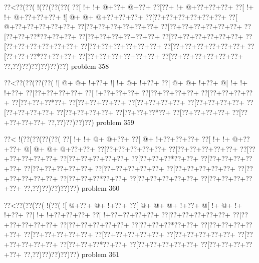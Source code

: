 \vbox{\vbox{\goo
\0??<\0??(\0??(\- !(\0??(\0??(\0??(
\0??[\- !+\- !+\- @+\0??+\- @+\0??+
\0??[\0??+\- !+\- @+\0??+\0??+\0??+
\0??[\- !+\- !+\- @+\0??+\0??+\0??+
\- ![\- @+\- @+\- @+\0??+\0??+\0??+
\0??[\0??+\0??+\0??+\0??+\0??+\0??+
\0??[\- @+\0??+\0??+\0??+\0??+\0??+
\0??[\0??+\0??+\0??+\0??+\0??+\0??+
\0??[\0??+\0??+\0??+\0??+\0??+\0??+
\0??[\0??+\0??+\0??*\0??+\0??+\0??+
\0??[\0??+\0??+\0??+\0??+\0??+\0??+
\0??[\0??+\0??+\0??+\0??+\0??+\0??+
\0??[\0??+\0??+\0??+\0??+\0??+\0??+
\0??[\0??+\0??+\0??+\0??+\0??+\0??+
\0??[\0??+\0??+\0??+\0??+\0??+\0??+
\0??[\0??+\0??+\0??*\0??+\0??+\0??+
\0??[\0??+\0??+\0??+\0??+\0??+\0??+
\0??[\0??+\0??+\0??+\0??+\0??+\0??+
\0??,\0??)\0??)\0??)\0??)\0??)\0??)
}
\hfil problem 358\hfil\break
}

\vbox{\vbox{\goo
\0??<\0??(\0??(\0??(\0??(
\- ![\- @+\- @+\- !+\0??+
\- ![\- !+\- @+\- !+\0??+
\0??[\- @+\- @+\- !+\0??+
\- @[\- !+\- !+\- !+\0??+
\0??[\0??+\0??+\0??+\0??+
\0??[\- !+\0??+\0??+\0??+
\0??[\0??+\0??+\0??+\0??+
\0??[\0??+\0??+\0??+\0??+
\0??[\0??+\0??+\0??*\0??+
\0??[\0??+\0??+\0??+\0??+
\0??[\0??+\0??+\0??+\0??+
\0??[\0??+\0??+\0??+\0??+
\0??[\0??+\0??+\0??+\0??+
\0??[\0??+\0??+\0??+\0??+
\0??[\0??+\0??+\0??*\0??+
\0??[\0??+\0??+\0??+\0??+
\0??[\0??+\0??+\0??+\0??+
\0??,\0??)\0??)\0??)\0??)
}
\hfil problem 359\hfil\break
}

\vbox{\vbox{\goo
\0??<\- !(\0??(\0??(\0??(\0??(
\0??[\- !+\- !+\- @+\- @+\0??+
\0??[\- @+\- !+\0??+\0??+\0??+
\0??[\- !+\- !+\- @+\0??+\0??+
\- @[\- @+\- @+\- @+\0??+\0??+
\0??[\0??+\0??+\0??+\0??+\0??+
\0??[\0??+\0??+\0??+\0??+\0??+
\0??[\0??+\0??+\0??+\0??+\0??+
\0??[\0??+\0??+\0??+\0??+\0??+
\0??[\0??+\0??+\0??*\0??+\0??+
\0??[\0??+\0??+\0??+\0??+\0??+
\0??[\0??+\0??+\0??+\0??+\0??+
\0??[\0??+\0??+\0??+\0??+\0??+
\0??[\0??+\0??+\0??+\0??+\0??+
\0??[\0??+\0??+\0??+\0??+\0??+
\0??[\0??+\0??+\0??*\0??+\0??+
\0??[\0??+\0??+\0??+\0??+\0??+
\0??[\0??+\0??+\0??+\0??+\0??+
\0??,\0??)\0??)\0??)\0??)\0??)
}
\hfil problem 360\hfil\break
}

\vbox{\vbox{\goo
\0??<\0??(\0??(\0??(\- !(\0??(
\- ![\- @+\0??+\- @+\- !+\0??+
\0??[\- @+\- @+\- @+\- !+\0??+
\- @[\- !+\- @+\- !+\- !+\0??+
\0??[\- !+\- !+\0??+\0??+\0??+
\0??[\- !+\0??+\0??+\0??+\0??+
\0??[\0??+\0??+\0??+\0??+\0??+
\0??[\0??+\0??+\0??+\0??+\0??+
\0??[\0??+\0??+\0??+\0??+\0??+
\0??[\0??+\0??+\0??*\0??+\0??+
\0??[\0??+\0??+\0??+\0??+\0??+
\0??[\0??+\0??+\0??+\0??+\0??+
\0??[\0??+\0??+\0??+\0??+\0??+
\0??[\0??+\0??+\0??+\0??+\0??+
\0??[\0??+\0??+\0??+\0??+\0??+
\0??[\0??+\0??+\0??*\0??+\0??+
\0??[\0??+\0??+\0??+\0??+\0??+
\0??[\0??+\0??+\0??+\0??+\0??+
\0??,\0??)\0??)\0??)\0??)\0??)
}
\hfil problem 361\hfil\break
}

